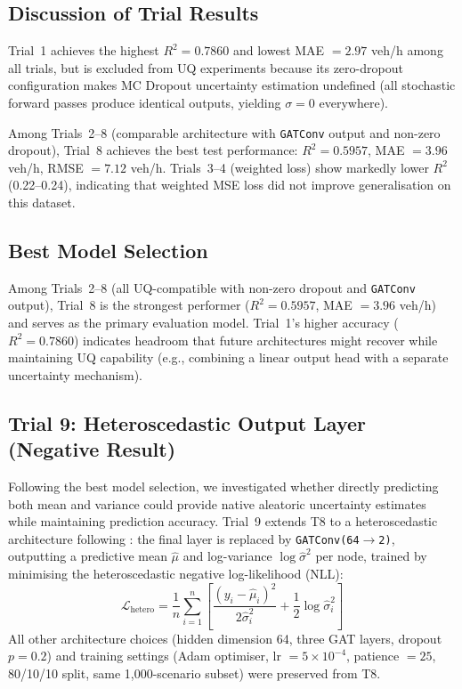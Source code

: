 \subsection{Discussion of Trial Results}

Trial~1 achieves the highest $R^2 = 0.7860$ and lowest MAE $= 2.97$ veh/h among all trials, but is excluded from UQ experiments because its zero-dropout configuration makes MC Dropout uncertainty estimation undefined (all stochastic forward passes produce identical outputs, yielding $\sigma = 0$ everywhere).

Among Trials~2--8 (comparable architecture with \texttt{GATConv} output and non-zero dropout), Trial~8 achieves the best test performance: $R^2 = 0.5957$, MAE $= 3.96$ veh/h, RMSE $= 7.12$ veh/h. Trials~3--4 (weighted loss) show markedly lower $R^2$ (0.22--0.24), indicating that weighted MSE loss did not improve generalisation on this dataset.

\subsection{Best Model Selection}

Among Trials~2--8 (all UQ-compatible with non-zero dropout and \texttt{GATConv} output), Trial~8 is the strongest performer ($R^2 = 0.5957$, MAE $= 3.96$ veh/h) and serves as the primary evaluation model. Trial~1's higher accuracy ($R^2 = 0.7860$) indicates headroom that future architectures might recover while maintaining UQ capability (e.g., combining a linear output head with a separate uncertainty mechanism).

\subsection{Trial 9: Heteroscedastic Output Layer (Negative Result)}\label{sec:trial9_heteroscedastic}

Following the best model selection, we investigated whether directly predicting both
mean and variance could provide native aleatoric uncertainty estimates while
maintaining prediction accuracy. Trial~9 extends T8 to a heteroscedastic
architecture following \textcite{kendall2017uncertainties}: the final layer is
replaced by \texttt{GATConv(64$\to$2)}, outputting a predictive mean $\hat{\mu}$
and log-variance $\log\hat{\sigma}^2$ per node, trained by minimising the
heteroscedastic negative log-likelihood (NLL):
\begin{equation}
    \mathcal{L}_\text{hetero} = \frac{1}{n}\sum_{i=1}^{n}\left[
    \frac{(y_i - \hat{\mu}_i)^2}{2\hat{\sigma}_i^2}
    + \frac{1}{2}\log\hat{\sigma}_i^2\right]
    \label{eq:hetero_nll}
\end{equation}
All other architecture choices (hidden dimension 64, three GAT layers,
dropout $p = 0.2$) and training settings (Adam optimiser,
lr $= 5\times10^{-4}$, patience $= 25$, 80/10/10 split,
same 1,000-scenario subset) were preserved from T8.

